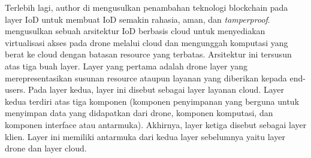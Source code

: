 Terlebih lagi, author di \citep{aggarwal2019new} mengusulkan penambahan teknologi blockchain pada layer IoD untuk membuat IoD semakin rahasia, aman, dan \emph{tamperproof}. \citet{qureshi2016dronemap} mengusulkan sebuah arsitektur IoD berbasis cloud untuk menyediakan virtualisasi akses pada drone melalui cloud dan mengunggah komputasi yang berat ke cloud dengan batasan resource yang terbatas. Arsitektur ini tersusun atas tiga buah layer. Layer yang pertama adalah drone layer yang merepresentasikan susunan resource ataupun layanan yang diberikan kepada end-users. Pada layer kedua, layer ini disebut sebagai layer layanan cloud. Layer kedua terdiri atas tiga komponen (komponen penyimpanan yang berguna untuk menyimpan data yang didapatkan dari drone, komponen komputasi, dan komponen interface atau antarmuka). Akhirnya, layer ketiga disebut sebagai layer klien. Layer ini memiliki antarmuka dari kedua layer sebelumnya yaitu layer drone dan layer cloud. 

